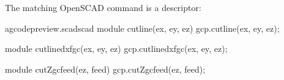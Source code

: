 \documentclass{ltxdoc}
\begin{document}
%   
%
%

The matching OpenSCAD command is a descriptor:

\lstset{firstnumber=\thegcpscad}
\begin{writecode}{a}{gcodepreview.scad}{scad}
module cutline(ex, ey, ez){
    gcp.cutline(ex, ey, ez);
}

module cutlinedxfgc(ex, ey, ez){
    gcp.cutlinedxfgc(ex, ey, ez);
}

module cutZgcfeed(ez, feed){
    gcp.cutZgcfeed(ez, feed);
}

\end{writecode}
\addtocounter{gcpscad}{12}      
\end{document}
